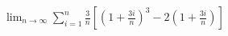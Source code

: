 \item $\displaystyle \lim_{n \to \infty} \sum_{i=1}^n \frac{3}{n} \left[ \left( 1 + \frac{3i}{n} \right)^3 - 2 \left( 1 + \frac{3i}{n} \right) \right]$
